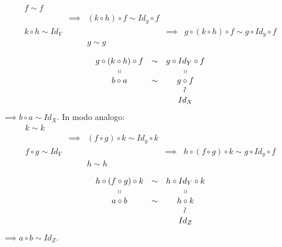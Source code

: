 \begin{demonstration}
\begin{itemize}
\begin{equation*}
\begin{array}{cccccc}
			f\sim f & & & &\\
			& \implies & \left(k\circ h\right)\circ f\sim Id_y\circ f& &\\
			k\circ h\sim Id_Y& & &\implies &g\circ \left(k\circ h\right)\circ f\sim g\circ Id_y\circ f \\
			& & g\sim g & &\\
		\end{array}
	\end{equation*}
	\begin{equation*}
	\begin{array}{ccc}
		g\circ \left(k\circ h\right)\circ f& \sim & g\circ Id_Y\circ f\\
		\shortparallel & & \shortparallel\\
		b\circ a & \sim & g\circ f\\
		& & \rotatebox{90}{$\sim$}\\
		& & Id_X
	\end{array}
	\end{equation*}
$\implies b\circ a\sim Id_X$. In modo analogo:
\begin{equation*}
	\begin{array}{cccccc}
		k\sim k & & & &\\
		& \implies & \left(f\circ g\right)\circ k\sim Id_y\circ k& &\\
		f\circ g\sim Id_Y& & &\implies &h\circ \left(f\circ g\right)\circ k\sim g\circ Id_y\circ f \\
		& & h\sim h & &\\
	\end{array}
\end{equation*}
\begin{equation*}
	\begin{array}{ccc}
		h\circ \left(f\circ g\right)\circ k& \sim & h\circ Id_Y\circ k\\
		\shortparallel & & \shortparallel\\
		a\circ b & \sim & h\circ k\\
		& & \rotatebox{90}{$\sim$}\\
		& & Id_Z
	\end{array}
\end{equation*}
$\implies a\circ b\sim Id_Z$.
\end{itemize}
\vspace{-3mm}
\end{demonstration}
